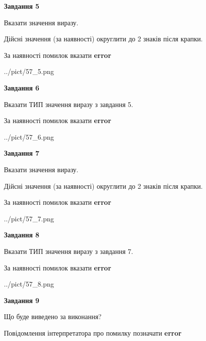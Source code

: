 \documentclass[11pt, ukrainian]{article}
\begin{document}
{\begin {large}
{\begin {center}\textbf{Завдання 5}\end {center}}\par
Вказати значення виразу. \par
Дійсні значення (за наявності) округлити до 2 знаків після крапки. \par
За наявності помилок вказати \textbf{error}

\begin{center}
	{../pict/57_5.png}
\end{center}
\newpage

{\begin {center}\textbf{Завдання 6}\end {center}}\par
Вказати ТИП значення виразу з завдання 5. \par
За наявності помилок вказати \textbf{error}

\begin{center}
	{../pict/57_6.png}
\end{center}
\newpage

{\begin {center}\textbf{Завдання 7}\end {center}}\par
Вказати значення виразу. \par
Дійсні значення (за наявності) округлити до 2 знаків після крапки. \par
За наявності помилок вказати \textbf{error}

\begin{center}
	{../pict/57_7.png}
\end{center}
\newpage

{\begin {center}\textbf{Завдання 8}\end {center}}\par
Вказати ТИП значення виразу з завдання 7. \par
За наявності помилок вказати \textbf{error}

\begin{center}
	{../pict/57_8.png}
\end{center}
\newpage

{\begin {center}\textbf{Завдання 9}\end {center}}\par
Що буде виведено за виконання? \par
Повідомлення інтерпретатора про помилку позначати \textbf{error}


\end{large}}
\end{document}
